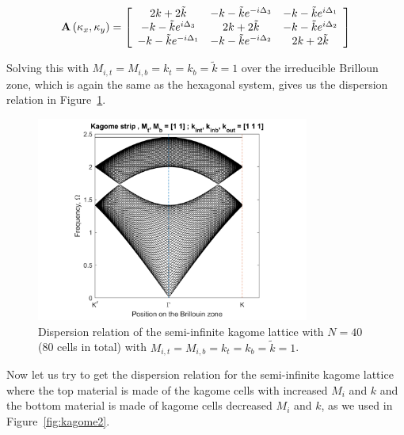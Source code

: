 \begin{align}
  \mathbf{A}\left(\kappa_{x},\kappa_{y}\right)=\left[
\begin{array}{ccc}
2k+2\tilde{k} & -k-\tilde{k}e^{-i\Delta_3} & -k-\tilde{k}e^{i\Delta_1} \\
-k-\tilde{k}e^{i\Delta_3} & 2k+2\tilde{k} & -k-\tilde{k}e^{i\Delta_2} \\
-k-\tilde{k}e^{-i\Delta_1} & -k-\tilde{k}e^{-i\Delta_2} & 2k+2\tilde{k} 
\end{array}\right]
\end{align}

Solving this with $M_{i,t}=M_{i,b}=k_t=k_b=\tilde{k}=1$ over the irreducible
Brilloun zone, which is again the same as the hexagonal system, gives us the
dispersion relation in Figure~\ref{fig:kagomestripdisper}.

\begin{figure}[!h]
\centering
\includegraphics[width=0.8\textwidth]{imgs/kagomestrip.png}
\caption{\label{fig:kagomestripdisper} Dispersion relation of the semi-infinite
  kagome lattice with $N=40$ (80 cells in total) with
  $M_{i,t}=M_{i,b}=k_t=k_b=\tilde{k}=1$.}
\end{figure}

Now let us try to get the dispersion relation for the semi-infinite kagome
lattice where the top material is made of the kagome cells with increased $M_i$
and $k$ and the bottom material is made of kagome cells decreased $M_i$ and
$k$, as we used in Figure~\ref{fig:kagome2}.


